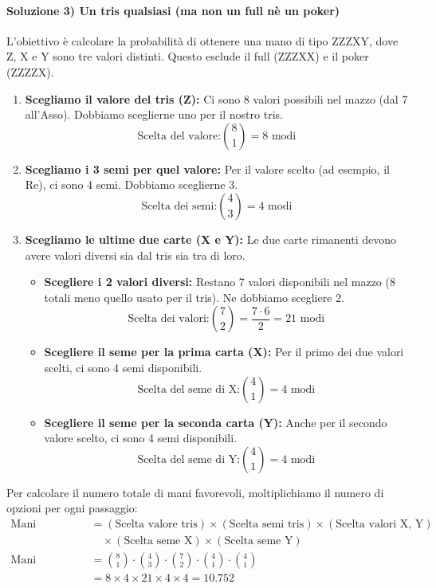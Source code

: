 \begin{esempio}
\paragraph{Soluzione 3) Un tris qualsiasi (ma non un full nè un poker)}
L'obiettivo è calcolare la probabilità di ottenere una mano di tipo ZZZXY, dove Z, X e Y sono tre valori distinti. Questo esclude il full (ZZZXX) e il poker (ZZZZX).

\begin{enumerate}
    \item \textbf{Scegliamo il valore del tris (Z):}
    Ci sono 8 valori possibili nel mazzo (dal 7 all'Asso). Dobbiamo sceglierne uno per il nostro tris.
    \[ \text{Scelta del valore:} \binom{8}{1} = 8 \text{ modi} \]

    \item \textbf{Scegliamo i 3 semi per quel valore:}
    Per il valore scelto (ad esempio, il Re), ci sono 4 semi. Dobbiamo sceglierne 3.
    \[ \text{Scelta dei semi:} \binom{4}{3} = 4 \text{ modi} \]

    \item \textbf{Scegliamo le ultime due carte (X e Y):}
    Le due carte rimanenti devono avere valori diversi sia dal tris sia tra di loro.
    \begin{itemize}
        \item \textbf{Scegliere i 2 valori diversi:} Restano 7 valori disponibili nel mazzo (8 totali meno quello usato per il tris). Ne dobbiamo scegliere 2.
        \[ \text{Scelta dei valori:} \binom{7}{2} = \frac{7 \cdot 6}{2} = 21 \text{ modi} \]
        
        \item \textbf{Scegliere il seme per la prima carta (X):} Per il primo dei due valori scelti, ci sono 4 semi disponibili.
        \[ \text{Scelta del seme di X:} \binom{4}{1} = 4 \text{ modi} \]
        
        \item \textbf{Scegliere il seme per la seconda carta (Y):} Anche per il secondo valore scelto, ci sono 4 semi disponibili.
        \[ \text{Scelta del seme di Y:} \binom{4}{1} = 4 \text{ modi} \]
    \end{itemize}
\end{enumerate}

Per calcolare il numero totale di mani favorevoli, moltiplichiamo il numero di opzioni per ogni passaggio:
\begin{align*}
\text{Mani favorevoli} &= (\text{Scelta valore tris}) \times (\text{Scelta semi tris}) \times (\text{Scelta valori X, Y}) \\
                      &\quad \times (\text{Scelta seme X}) \times (\text{Scelta seme Y}) \\
\text{Mani favorevoli} &= \binom{8}{1} \cdot \binom{4}{3} \cdot \binom{7}{2} \cdot \binom{4}{1} \cdot \binom{4}{1} \\
                      &= 8 \times 4 \times 21 \times 4 \times 4 = \mathbf{10.752}
\end{align*}


\end{esempio}
